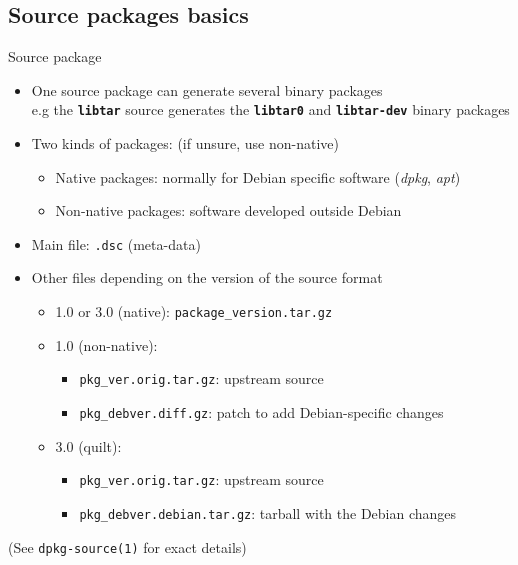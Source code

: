 \documentclass[10pt,final]{beamer}
\begin{document}
\subsection{Source packages basics}
\begin{frame}{Source package}
  \begin{itemize}
  \item One source package can generate several binary packages\\
    {\small e.g the \texttt{\bfseries libtar} source generates the
      \texttt{\bfseries libtar0} and \texttt{\bfseries libtar-dev} binary
      packages} \hbr
  \item Two kinds of packages: (if unsure, use non-native)
    \begin{itemize}
      \small
    \item Native packages: normally for Debian specific software (\textsl{dpkg}, \textsl{apt})
    \item Non-native packages: software developed outside Debian
    \end{itemize}
    \hbr
  \item Main file: \texttt{.dsc} (meta-data)
    \hbr
  \item Other files depending on the version of the source format
    \begin{itemize}
    \item 1.0 or 3.0 (native): \texttt{package\_version.tar.gz}
      \hbr
    \item 1.0 (non-native):
      \begin{itemize}
      \item \texttt{pkg\_ver.orig.tar.gz}: upstream source
      \item \texttt{pkg\_debver.diff.gz}: patch to add Debian-specific changes
      \end{itemize}
      \hbr
    \item 3.0 (quilt):
      \begin{itemize}
      \item \texttt{pkg\_ver.orig.tar.gz}: upstream source
      \item \texttt{pkg\_debver.debian.tar.gz}: tarball with the Debian changes
      \end{itemize}
    \end{itemize}
  \end{itemize}
  \hbr
  (See \texttt{dpkg-source(1)} for exact details)
\end{frame}
\end{document}
